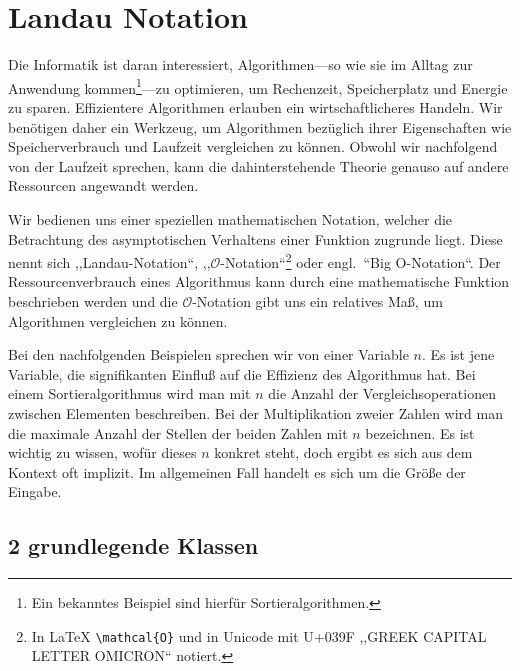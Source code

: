 \chapter{Landau Notation}
%
Die Informatik ist daran interessiert, Algorithmen---so wie sie im Alltag zur Anwendung kommen\footnote{Ein bekanntes Beispiel sind hierfür Sortieralgorithmen.}---zu optimieren, um Rechenzeit, Speicherplatz und Energie zu sparen. Effizientere Algorithmen erlauben ein wirtschaftlicheres Handeln. Wir benötigen daher ein Werkzeug, um Algorithmen bezüglich ihrer Eigenschaften wie Speicherverbrauch und Laufzeit vergleichen zu können. Obwohl wir nachfolgend von der Laufzeit sprechen, kann die dahinterstehende Theorie genauso auf andere Ressourcen angewandt werden.

Wir bedienen uns einer speziellen mathematischen Notation, welcher die Betrachtung des asymptotischen Verhaltens einer Funktion zugrunde liegt. Diese nennt sich ,,Landau-Notation``, ,,$\mathcal{O}$-Notation``\footnote{In \LaTeX{}  \texttt{\textbackslash mathcal\{O\}} und in Unicode mit U+039F ,,GREEK CAPITAL LETTER OMICRON`` notiert.} oder engl.~``Big O-Notation``. Der Ressourcenverbrauch eines Algorithmus kann durch eine mathematische Funktion beschrieben werden und die $\mathcal{O}$-Notation gibt uns ein relatives Maß, um Algorithmen vergleichen zu können.

Bei den nachfolgenden Beispielen sprechen wir von einer Variable $n$. Es ist jene Variable, die signifikanten Einfluß auf die Effizienz des Algorithmus hat. Bei einem Sortieralgorithmus wird man mit $n$ die Anzahl der Vergleichsoperationen zwischen Elementen beschreiben. Bei der Multiplikation zweier Zahlen wird man die maximale Anzahl der Stellen der beiden Zahlen mit $n$ bezeichnen. Es ist wichtig zu wissen, wofür dieses $n$ konkret steht, doch ergibt es sich aus dem Kontext oft implizit. Im allgemeinen Fall handelt es sich um die Größe der Eingabe.
%
\section{2 grundlegende Klassen}
